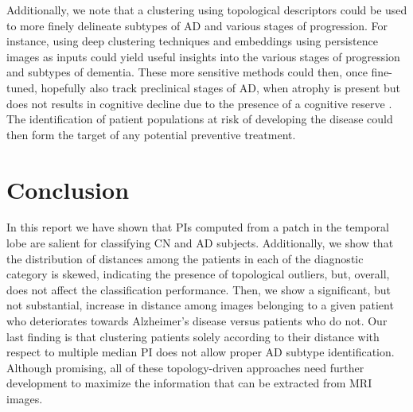\documentclass{article}
\begin{document}
Additionally, we note that a clustering using topological descriptors could be used to more finely
delineate subtypes of AD and various stages of progression. For instance, using deep clustering
techniques and embeddings using persistence images as inputs could yield useful insights into the
various stages of progression and subtypes of dementia. These more sensitive methods could then,
once fine-tuned, hopefully also track preclinical stages of AD, when atrophy is present but does not
results in cognitive decline due to the presence of a cognitive reserve
\citep{scarmeas2004cognitive, van2017neuroimaging}. The identification of patient populations at
risk of developing the disease could then form the target of any potential preventive treatment.
\clearpage
\section{Conclusion}

In this report we have shown that PIs computed from a patch in the temporal lobe are salient for
classifying CN and AD subjects. Additionally, we show that the distribution of distances among the
patients in each of the diagnostic category is skewed, indicating the presence of topological
outliers, but, overall, does not affect the classification performance. Then, we show a significant,
but not substantial, increase in distance among images belonging to a given patient who deteriorates
towards Alzheimer's disease versus patients who do not. Our last finding is that clustering patients
solely according to their distance with respect to multiple median PI does not allow proper AD
subtype identification. Although promising, all of these topology-driven approaches need further
development to maximize the information that can be extracted from MRI images.

\clearpage
 

\clearpage
\appendix
\end{document}
